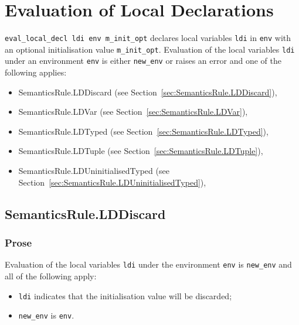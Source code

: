 \documentclass{book}
\begin{document}

\chapter{Evaluation of Local Declarations \label{chap:eval_local_decl}}

\texttt{eval\_local\_decl ldi env m\_init\_opt} declares local variables
\texttt{ldi} in \texttt{env} with an optional initialisation value
\texttt{m\_init\_opt}.  Evaluation of the local variables \texttt{ldi}
under an environment \texttt{env} is either \texttt{new\_env} or raises an
error and one of the following applies:
\begin{itemize}
  \item SemanticsRule.LDDiscard (see Section~\ref{sec:SemanticsRule.LDDiscard}),
  \item SemanticsRule.LDVar (see Section~\ref{sec:SemanticsRule.LDVar}),
  \item SemanticsRule.LDTyped (see Section~\ref{sec:SemanticsRule.LDTyped}),
  \item SemanticsRule.LDTuple (see Section~\ref{sec:SemanticsRule.LDTuple}),
  \item SemanticsRule.LDUninitialisedTyped (see Section~\ref{sec:SemanticsRule.LDUninitialisedTyped}),
\end{itemize}

\section{SemanticsRule.LDDiscard \label{sec:SemanticsRule.LDDiscard}}

    \subsection{Prose}
Evaluation of the local variables \texttt{ldi} under the environment
\texttt{env} is \texttt{new\_env} and all of the following apply:
    \begin{itemize}
    \item \texttt{ldi} indicates that the initialisation value will be discarded;
    \item \texttt{new\_env} is \texttt{env}.
    \end{itemize}
\end{document}

